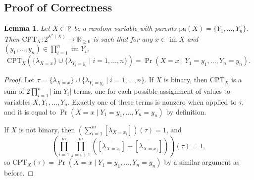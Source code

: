 \documentclass{article}
\newtheorem{lemma}{Lemma}
\theoremstyle{definition}
\theoremstyle{remark}
\DeclareMathOperator{\im}{im}
\begin{document}
\subsection{Proof of Correctness}

\begin{lemma} \label{lemma:cpt}
  Let $X \in \mathcal{V}$ be a random variable with parents $\mathrm{pa}(X) = \{ Y_1,
  \dots, Y_n \}$. Then $\mathrm{CPT}_X\colon 2^{E^*(X)} \to \mathbb{R}_{\ge 0}$
  is such that for any $x \in \im X$ and $(y_1, \dots, y_n) \in \prod_{i=1}^n
  \im Y_i$,
  \[
    \mathrm{CPT}_X (\{ \lambda_{X=x} \} \cup \{ \lambda_{Y_i=y_i} \mid i = 1,
    \dots, n \}) = \Pr(X = x \mid Y_1 = y_1, \dots, Y_n = y_n).
  \]
\end{lemma}
\begin{proof}
  Let $\tau = \{ \lambda_{X=x} \} \cup \{ \lambda_{Y_i=y_i} \mid i = 1, \dots, n
  \}$. If $X$ is binary, then $\mathrm{CPT}_X$ is a sum of $2\prod_{i=1}^n |\im
  Y_i|$ terms, one for each possible assignment of values to variables $X, Y_1,
  \dots, Y_n$. Exactly one of these terms is nonzero when applied to $\tau$, and
  it is equal to $\Pr(X = x \mid Y_1 = y_1, \dots, Y_n = y_n)$ by definition.

  If $X$ is not binary, then $\left( \sum_{i=1}^m [\lambda_{X = x_i}]
  \right)(\tau) = 1$, and
  \[
    \left( \prod_{i=1}^m \prod_{j=i+1}^m (\overline{[\lambda_{X = x_i}]} +
      \overline{[\lambda_{X = x_j}]}) \right)(\tau) = 1,
  \]
  so $\mathrm{CPT}_X(\tau) = \Pr(X = x \mid Y_1 = y_1, \dots, Y_n = y_n)$ by a
  similar argument as before.
\end{proof}
\end{document}
